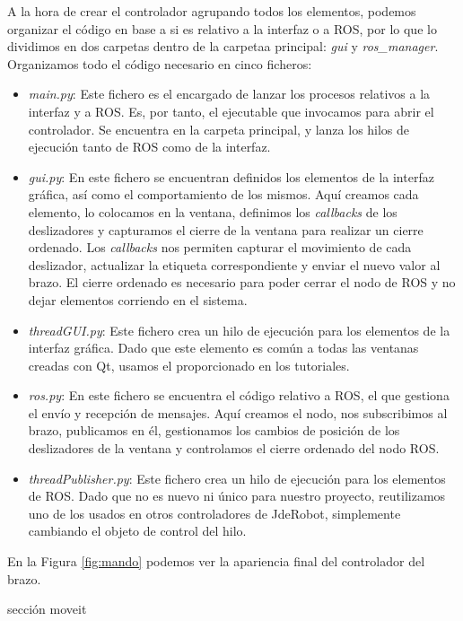 A la hora de crear el controlador agrupando todos los elementos, podemos organizar el código en base a si es relativo a la interfaz o a ROS, por lo que lo dividimos en dos carpetas dentro de la carpetaa principal: \textit{gui} y \textit{ros\_manager}. Organizamos todo el código necesario en cinco ficheros:
\begin{itemize}
	\item \textit{main.py}: Este fichero es el encargado de lanzar los procesos relativos a la interfaz y a ROS. Es, por tanto, el ejecutable que invocamos para abrir el controlador. Se encuentra en la carpeta principal, y lanza los hilos de ejecución tanto de ROS como de la interfaz.
	
	\item \textit{gui.py}: En este fichero se encuentran definidos los elementos de la interfaz gráfica, así como el comportamiento de los mismos. Aquí creamos cada elemento, lo colocamos en la ventana, definimos los \textit{callbacks} de los deslizadores y capturamos el cierre de la ventana para realizar un cierre ordenado. Los \textit{callbacks} nos permiten capturar el movimiento de cada deslizador, actualizar la etiqueta correspondiente y enviar el nuevo valor al brazo. El cierre ordenado es necesario para poder cerrar el nodo de ROS y no dejar elementos corriendo en el sistema.
	
	\item \textit{threadGUI.py}: Este fichero crea un hilo de ejecución para los elementos de la interfaz gráfica. Dado que este elemento es común a todas las ventanas creadas con Qt, usamos el proporcionado en los tutoriales.
	
	\item \textit{ros.py}: En este fichero se encuentra el código relativo a ROS, el que gestiona el envío y recepción de mensajes. Aquí creamos el nodo, nos subscribimos al brazo, publicamos en él, gestionamos los cambios de posición de los deslizadores de la ventana y controlamos el cierre ordenado del nodo ROS.
	
	\item \textit{threadPublisher.py}: Este fichero crea un hilo de ejecución para los elementos de ROS. Dado que no es nuevo ni único para nuestro proyecto, reutilizamos uno de los usados en otros controladores de JdeRobot, simplemente cambiando el objeto de control del hilo.
	
\end{itemize}

En la Figura \ref{fig:mando} podemos ver la apariencia final del controlador del brazo.







sección moveit









